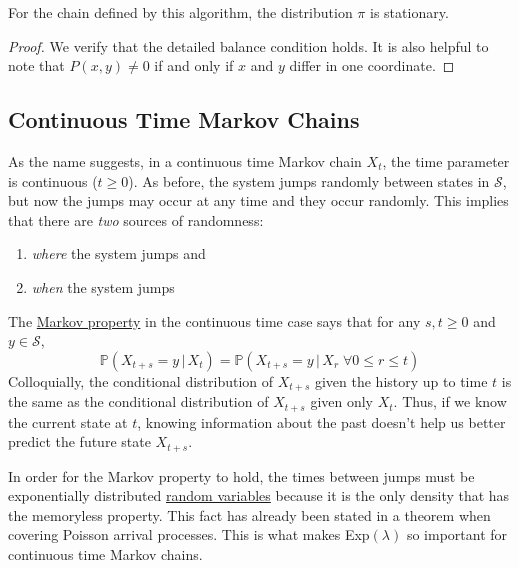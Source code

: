     \begin{theorem}
      \label{thm:stationarity-of-the-gibbs-sampler}
      For the chain defined by this algorithm, the distribution $\pi$ is stationary. 
    \end{theorem}
    \begin{proof}
      We verify that the detailed balance condition holds. It is also helpful to note that $P(x, y) \neq 0$ if and only if $x$ and $y$ differ in one coordinate. 
    \end{proof}

\subsection{Continuous Time Markov Chains}

  As the name suggests, in a continuous time Markov chain $X_t$, the time parameter is continuous ($t \geq 0$). As before, the system jumps randomly between states in $\mathcal{S}$, but now the jumps may occur at any time and they occur randomly. This implies that there are \textit{two} sources of randomness:
  \begin{enumerate}
    \item \textit{where} the system jumps and 
    \item \textit{when} the system jumps
  \end{enumerate}

  \begin{definition}
    \label{def:continuous-time-markov-chain}
    The \hyperref[def:markov-property]{Markov property} in the continuous time case says that for any $s, t \geq 0$ and $y \in \mathcal{S}$, 
    \begin{equation}
      \mathbb{P}(X_{t + s} = y \, | \, X_t) = \mathbb{P}(X_{t+s} = y \, | \, X_r \; \forall 0 \leq r \leq t)
    \end{equation}
    Colloquially, the conditional distribution of $X_{t+s}$ given the history up to time $t$ is the same as the conditional distribution of $X_{t+s}$ given only $X_t$. Thus, if we know the current state at $t$, knowing information about the past doesn't help us better predict the future state $X_{t+s}$. 

    In order for the Markov property to hold, the times between jumps must be exponentially distributed \hyperref[def:random-variable]{random variables} because it is the only density that has the memoryless property. This fact has already been stated in a theorem when covering Poisson arrival processes. This is what makes Exp$(\lambda)$ so important for continuous time Markov chains. 
  \end{definition}

